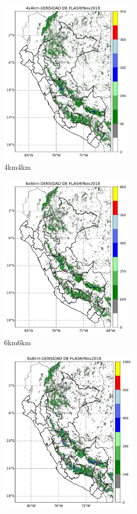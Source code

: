 \begin{figure}[H]
  \centering
  \begin{subfigure}{0.4\textwidth}
    \includegraphics[height=8cm]{E_IMAGENES/5_Metodologia/fed_4_4}
    \caption{4km\times 4km}
  \end{subfigure}\hfil
  \begin{subfigure}{0.4\textwidth}
    \includegraphics[height=8cm]{E_IMAGENES/5_Metodologia/fed_6_6}
    \caption{6km\times 6km}
  \end{subfigure}
  \medskip
  \begin{subfigure}{0.4\textwidth}
    \includegraphics[height=8cm]{E_IMAGENES/5_Metodologia/fed_8_8}

\end{subfigure}
\end{figure}
